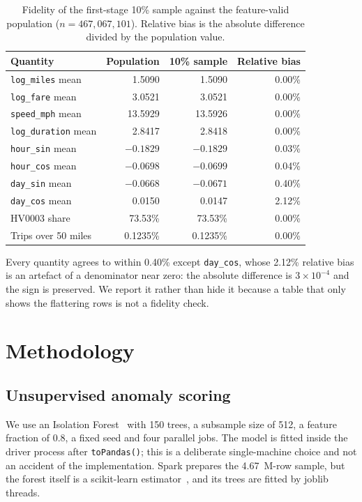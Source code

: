 \documentclass[11pt,a4paper]{article}
\newcommand{\code}[1]{\texttt{\small #1}}
\begin{document}
\begin{table}[t]
\centering
\small
\caption{Fidelity of the first-stage 10\% sample against the feature-valid population ($n = 467{,}067{,}101$). Relative bias is the absolute difference divided by the population value.}
\label{tab:fidelity}
\begin{tabular}{lrrr}
\toprule
Quantity & Population & 10\% sample & Relative bias \\
\midrule
\code{log\_miles} mean & 1.5090 & 1.5090 & 0.00\% \\
\code{log\_fare} mean & 3.0521 & 3.0521 & 0.00\% \\
\code{speed\_mph} mean & 13.5929 & 13.5926 & 0.00\% \\
\code{log\_duration} mean & 2.8417 & 2.8418 & 0.00\% \\
\code{hour\_sin} mean & $-0.1829$ & $-0.1829$ & 0.03\% \\
\code{hour\_cos} mean & $-0.0698$ & $-0.0699$ & 0.04\% \\
\code{day\_sin} mean & $-0.0668$ & $-0.0671$ & 0.40\% \\
\code{day\_cos} mean & 0.0150 & 0.0147 & 2.12\% \\
HV0003 share & 73.53\% & 73.53\% & 0.00\% \\
Trips over 50 miles & 0.1235\% & 0.1235\% & 0.00\% \\
\bottomrule
\end{tabular}
\end{table}

Every quantity agrees to within 0.40\% except \code{day\_cos}, whose 2.12\% relative bias is an artefact of a denominator near zero: the absolute difference is $3 \times 10^{-4}$ and the sign is preserved. We report it rather than hide it because a table that only shows the flattering rows is not a fidelity check.

\section{Methodology}
\label{sec:method}

\subsection{Unsupervised anomaly scoring}

We use an Isolation Forest~\cite{liu2008} with 150 trees, a subsample size of 512, a feature fraction of 0.8, a fixed seed and four parallel jobs. The model is fitted inside the driver process after \code{toPandas()}; this is a deliberate single-machine choice and not an accident of the implementation. Spark prepares the 4.67~M-row sample, but the forest itself is a scikit-learn estimator~\cite{sklearn}, and its trees are fitted by joblib threads.
\end{document}
